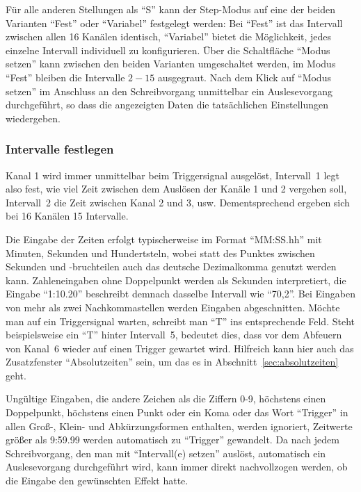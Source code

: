 \documentclass[paper=a4, open=any]{scrbook}
\begin{document}
				Für alle anderen Stellungen als \enquote{S} kann der Step-Modus auf eine der beiden Varianten \enquote{Fest} oder \enquote{Variabel} festgelegt werden: Bei \enquote{Fest} ist das Intervall zwischen allen 16 Kanälen identisch, \enquote{Variabel} bietet die Möglichkeit, jedes einzelne Intervall individuell zu konfigurieren. Über die Schaltfläche \enquote{Modus setzen} kann zwischen den beiden Varianten umgeschaltet werden, im Modus \enquote{Fest} bleiben die Intervalle $2-15$ ausgegraut. Nach dem Klick auf \enquote{Modus setzen} im Anschluss an den Schreibvorgang unmittelbar ein Auslesevorgang durchgeführt, so dass die angezeigten Daten die tatsächlichen Einstellungen wiedergeben.				
				
			\subsubsection*{Intervalle festlegen}	
				
				Kanal 1 wird immer unmittelbar beim Triggersignal ausgelöst, Intervall~1 legt also fest, wie viel Zeit zwischen dem Auslösen der Kanäle 1 und 2 vergehen soll, Intervall~2 die Zeit zwischen Kanal 2 und 3, usw. Dementsprechend ergeben sich bei 16 Kanälen 15 Intervalle.
				
				Die Eingabe der Zeiten erfolgt typischerweise im Format \enquote{MM:SS.hh} mit Minuten, Sekunden und Hundertsteln, wobei statt des Punktes zwischen Sekunden und -bruchteilen auch das deutsche Dezimalkomma genutzt werden kann. Zahleneingaben ohne Doppelpunkt werden als Sekunden interpretiert, die Eingabe \enquote{1:10.20} beschreibt demnach dasselbe Intervall wie \enquote{70,2}. Bei Eingaben von mehr als zwei Nachkommastellen werden Eingaben abgeschnitten. Möchte man auf ein Triggersignal warten, schreibt man \enquote{T} ins entsprechende Feld. Steht beispielsweise ein \enquote{T} hinter Intervall~5, bedeutet dies, dass vor dem Abfeuern von Kanal~6 wieder auf einen Trigger gewartet wird. Hilfreich kann hier auch das Zusatzfenster \enquote{Absolutzeiten} sein, um das es in Abschnitt~\ref{sec:absolutzeiten} geht.
				
				Ungültige Eingaben, die andere Zeichen als die Ziffern 0-9, höchstens einen Doppelpunkt, höchstens einen Punkt oder ein Koma oder das Wort \enquote{Trigger} in allen Groß-, Klein- und Abkürzungsformen enthalten, werden ignoriert, Zeitwerte größer als 9:59.99 werden automatisch zu \enquote{Trigger} gewandelt. Da nach jedem Schreibvorgang, den man mit \enquote{Intervall(e) setzen} auslöst, automatisch ein Auslesevorgang durchgeführt wird, kann immer direkt nachvollzogen werden, ob die Eingabe den gewünschten Effekt hatte.
				
\end{document}
